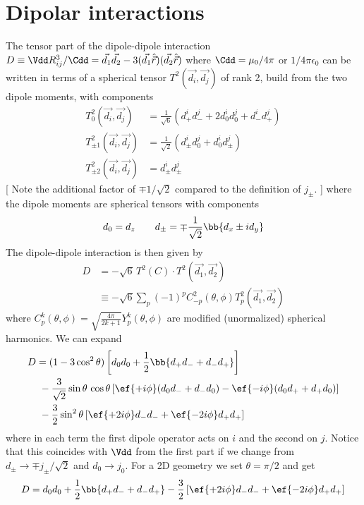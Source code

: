 \section{Dipolar interactions}
The tensor part of the dipole-dipole interaction $D\equiv \Vdd R_{ij}^3/\Cdd=\vec{d_1}\vec{d_2}-3(\vec{d_1}\hat{\vec{r}})(\vec{d_2}\hat{\vec{r}})$ where $\Cdd = \mu_0 /4\pi$ or $1/4\pi\epsilon_0$ can be written in terms of a spherical tensor $T^2(\vec{d_i},\vec{d_j})$ of rank 2, build from the two dipole moments, with components
\begin{align*}
T^2_0(\vec{d_i},\vec{d_j}) &= \frac{1}{\sqrt{6}} (d^i_+ d^j_- + 2d^i_0 d^j_0 + d^i_{-} d^j_{+})\\
T^2_{\pm 1}(\vec{d_i},\vec{d_j}) &= \frac{1}{\sqrt{2}} (d^i_{\pm} d^j_0 + d^i_0 d^j_{\pm})\\
T^2_{\pm 2}(\vec{d_i},\vec{d_j}) &= d^i_{\pm} d^j_{\pm} \phantom{\frac{1}{\sqrt{42}}}
\end{align*}
[ Note the additional factor of $\mp 1/\sqrt{2}$ compared to the definition of $j_\pm$. ]
where the dipole moments are spherical tensors with components
\begin{align}\label{eq:dipsph}
d_0 = d_z\qquad d_\pm = \mp\frac{1}{\sqrt{2}}\bb{d_x\pm i d_y}
\end{align}
The dipole-dipole interaction is then given by
\begin{align}
D &= -\sqrt{6} \,T^2(C)\cdot T^2(\vec{d_1},\vec{d_2})\\
&\equiv-\sqrt{6}  \sum_p (-1)^p C^2_{-p}(\theta,\phi) T^2_p(\vec{d_1},\vec{d_2})\nonumber
\end{align}
where $C^k_p(\theta,\phi)=\sqrt{\frac{4\pi}{2k+1}} Y^k_p(\theta,\phi)$ are modified (unormalized) spherical harmonics. We can expand
\begin{align}\label{eq:doperator}
D &= (1-3\cos^2 \theta) \left[d_0 d_0 + \frac{1}{2}\bb{d_+ d_- + d_- d_+} \right] \\
&\,\,-\frac{3}{\sqrt{2}}\sin\theta \,\cos\theta \left[ \ef{+i\phi} (d_0 d_- + d_- d_0) - \ef{-i\phi} (d_0 d_+ + d_+ d_0) \right]\nonumber\\
&\,\,-\frac{3}{2}\sin^2\theta \left[ \ef{+2i\phi} d_- d_- + \ef{-2i\phi} d_+ d_+\right]\nonumber
\end{align}
where in each term the first dipole operator acts on $i$ and the second on $j$. Notice that this coincides with $\Vdd$ from the first part if we change from $d_\pm \rightarrow \mp j_\pm/\sqrt{2}$ and $d_0\rightarrow j_0$.
For a 2D geometry we set $\theta=\pi/2$ and get
\begin{align*}
D = d_0 d_0 + \frac{1}{2}\bb{d_+ d_- + d_- d_+} -\frac{3}{2} \left[ \ef{+2i\phi} d_- d_- + \ef{-2i\phi} d_+ d_+\right]
\end{align*}
